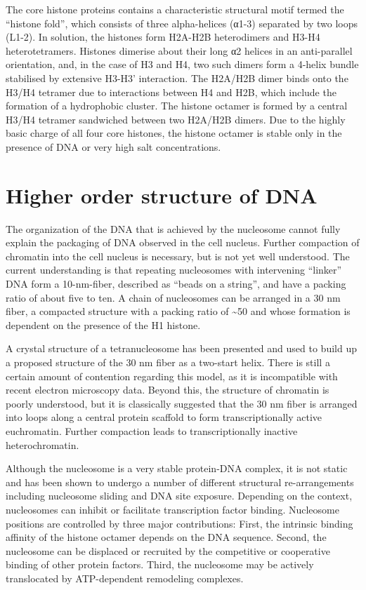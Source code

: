 The core histone proteins contains a characteristic structural motif termed the ``histone fold'', which consists of three alpha-helices (α1-3) separated by two loops (L1-2). In solution, the histones form H2A-H2B heterodimers and H3-H4 heterotetramers. Histones dimerise about their long α2 helices in an anti-parallel orientation, and, in the case of H3 and H4, two such dimers form a 4-helix bundle stabilised by extensive H3-H3' interaction. The H2A/H2B dimer binds onto the H3/H4 tetramer due to interactions between H4 and H2B, which include the formation of a hydrophobic cluster. The histone octamer is formed by a central H3/H4 tetramer sandwiched between two H2A/H2B dimers. Due to the highly basic charge of all four core histones, the histone octamer is stable only in the presence of DNA or very high salt concentrations.

\hypertarget{higher-order-structure-of-dna}{%
\section{Higher order structure of DNA}\label{higher-order-structure-of-dna}}

The organization of the DNA that is achieved by the nucleosome cannot fully explain the packaging of DNA observed in the cell nucleus. Further compaction of chromatin into the cell nucleus is necessary, but is not yet well understood. The current understanding is that repeating nucleosomes with intervening ``linker'' DNA form a 10-nm-fiber, described as ``beads on a string'', and have a packing ratio of about five to ten. A chain of nucleosomes can be arranged in a 30 nm fiber, a compacted structure with a packing ratio of \textasciitilde{}50 and whose formation is dependent on the presence of the H1 histone.

A crystal structure of a tetranucleosome has been presented and used to build up a proposed structure of the 30 nm fiber as a two-start helix. There is still a certain amount of contention regarding this model, as it is incompatible with recent electron microscopy data. Beyond this, the structure of chromatin is poorly understood, but it is classically suggested that the 30 nm fiber is arranged into loops along a central protein scaffold to form transcriptionally active euchromatin. Further compaction leads to transcriptionally inactive heterochromatin.

Although the nucleosome is a very stable protein-DNA complex, it is not static and has been shown to undergo a number of different structural re-arrangements including nucleosome sliding and DNA site exposure. Depending on the context, nucleosomes can inhibit or facilitate transcription factor binding. Nucleosome positions are controlled by three major contributions: First, the intrinsic binding affinity of the histone octamer depends on the DNA sequence. Second, the nucleosome can be displaced or recruited by the competitive or cooperative binding of other protein factors. Third, the nucleosome may be actively translocated by ATP-dependent remodeling complexes.

